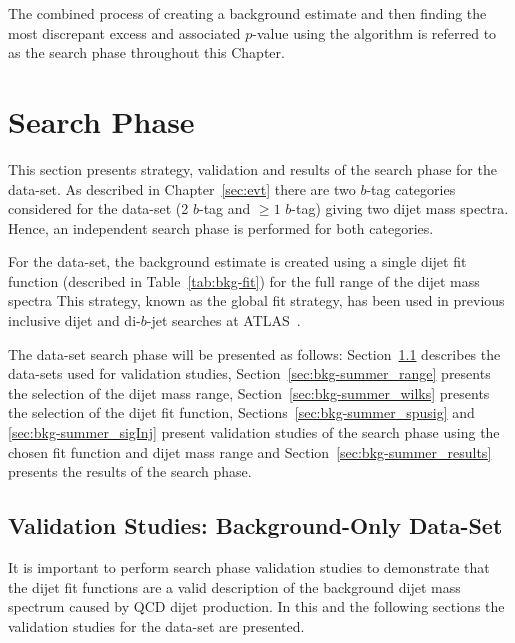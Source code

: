 The combined process of creating a background estimate and then
finding the most discrepant excess and associated $p$-value using the \bh{} algorithm
is referred to as the search phase throughout this Chapter.

\clearpage
\section{\summer{} Search Phase}
\label{sec:bkg-summer}

This section presents strategy, validation and results of the search phase for the \summer{} data-set.
As described in Chapter~\ref{sec:evt}
there are two $b$-tag categories considered for the \summer{} data-set 
(2 $b$-tag and $\geq1$ $b$-tag) giving two dijet mass spectra.
Hence, an independent search phase is performed for both categories.

For the \summer{} data-set, the background estimate is created using
a single dijet fit function (described in Table~\ref{tab:bkg-fit})
for the full range of the dijet mass spectra
This strategy, known as the global fit strategy,
has been used in previous inclusive dijet and di-$b$-jet
searches at ATLAS~\cite{dijet-mori16_paper,dibjet-mori16_paper}.

The \summer{} data-set search phase will be presented as follows:
Section~\ref{sec:bkg-summer_fitCR} describes the data-sets used for validation studies,
Section~\ref{sec:bkg-summer_range} presents the selection of the dijet mass range,
Section~\ref{sec:bkg-summer_wilks} presents the selection of the dijet fit function,
Sections~\ref{sec:bkg-summer_spusig} and \ref{sec:bkg-summer_sigInj} present validation studies of the search phase using the chosen fit function and dijet mass range
and Section~\ref{sec:bkg-summer_results} presents the results of the search phase.




\subsection{Validation Studies: Background-Only Data-Set}
\label{sec:bkg-summer_fitCR}

It is important to perform search phase validation studies to demonstrate
that the dijet fit functions are a valid description of the background dijet mass spectrum caused by QCD dijet production.
In this and the following sections the validation studies for the \summer{} data-set are presented.

